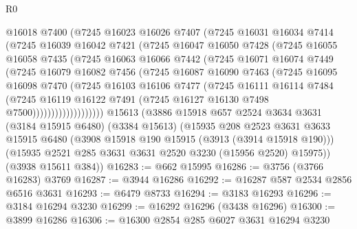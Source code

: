 \begin{lexlean}{R0}
\begin{coremodule}
              @16018
              @7400
              (@7245
                @16023
                @16026
                @7407
                (@7245
                  @16031
                  @16034
                  @7414
                  (@7245
                    @16039
                    @16042
                    @7421
                    (@7245
                      @16047
                      @16050
                      @7428
                      (@7245
                        @16055
                        @16058
                        @7435
                        (@7245
                          @16063
                          @16066
                          @7442
                          (@7245
                            @16071
                            @16074
                            @7449
                            (@7245
                              @16079
                              @16082
                              @7456
                              (@7245
                                @16087
                                @16090
                                @7463
                                (@7245
                                  @16095
                                  @16098
                                  @7470
                                  (@7245
                                    @16103
                                    @16106
                                    @7477
                                    (@7245
                                      @16111
                                      @16114
                                      @7484
                                      (@7245
                                        @16119
                                        @16122
                                        @7491
                                        (@7245 @16127 @16130 @7498 @7500)))))))))))))))))))
    @15613
    (@3886
      @15918
      @657
      @2524
      @3634
      @3631
      (@3184 @15915 @6480)
      (@3384 @15613)
      (@15935
        @208
        @2523
        @3631
        @3633
        @15915
        @6480
        (@3908 @15918 @190 @15915 (@3913 (@3914 @15918 @190)))
        (@15935 @2521 @285 @3631 @3631 @2520 @3230 (@15956 @2520) @15975))
      (@3938 @15611 @384))
@16283 := @662 @15995
@16286 := @3756 (@3766 @16283) @3769
@16287 := @3944 @16286
@16292 := @16287 @587 @2534 @2856 @6516 @3631
@16293 := @6479 @8733
@16294 := @3183 @16293
@16296 := @3184 @16294 @3230
@16299 := @16292 @16296 (@3438 @16296)
@16300 := @3899 @16286
@16306 := @16300 @2854 @285 @6027 @3631 @16294 @3230

\end{coremodule}
\end{lexlean}
